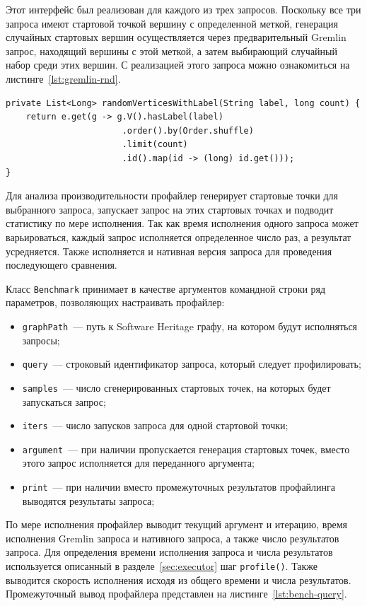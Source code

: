\documentclass[times,specification,annotation]{itmo-student-thesis}
\begin{document}
Этот интерфейс был реализован для каждого из трех запросов. Поскольку все три запроса имеют стартовой точкой вершину с определенной меткой, генерация случайных стартовых вершин осуществляется через предварительный Gremlin запрос, находящий вершины с этой меткой, а затем выбирающий случайный набор среди этих вершин. С реализацией этого запроса можно ознакомиться на листинге~\ref{lst:gremlin-rnd}.

\begin{lstlisting}[float=!h,caption={Генерация случайных стартовых вершин},label={lst:gremlin-rnd}]
private List<Long> randomVerticesWithLabel(String label, long count) {
    return e.get(g -> g.V().hasLabel(label)
                       .order().by(Order.shuffle)
                       .limit(count)
                       .id().map(id -> (long) id.get()));
}
\end{lstlisting}

Для анализа производительности профайлер генерирует стартовые точки для выбранного запроса, запускает запрос на этих стартовых точках и подводит статистику по мере исполнения. Так как время исполнения одного запроса может варьироваться, каждый запрос исполняется определенное число раз, а результат усредняется. Также исполняется и нативная версия запроса для проведения последующего сравнения.

Класс \texttt{Benchmark} принимает в качестве аргументов командной строки ряд параметров, позволяющих настраивать профайлер:

\begin{itemize}
    \item \texttt{graphPath}~--- путь к Software Heritage графу, на котором будут исполняться запросы;
    \item \texttt{query}~--- строковый идентификатор запроса, который следует профилировать;
    \item \texttt{samples}~--- число сгенерированных стартовых точек, на которых будет запускаться запрос;
    \item \texttt{iters}~--- число запусков запроса для одной стартовой точки;
    \item \texttt{argument}~--- при наличии пропускается генерация стартовых точек, вместо этого запрос исполняется для переданного аргумента;
    \item \texttt{print}~--- при наличии вместо промежуточных результатов профайлинга выводятся результаты запроса;
\end{itemize}

По мере исполнения профайлер выводит текущий аргумент и итерацию, время исполнения Gremlin запроса и нативного запроса, а также число результатов запроса. Для определения времени исполнения запроса и числа результатов используется описанный в разделе~\ref{sec:executor} шаг \texttt{profile()}. Также выводится скорость исполнения исходя из общего времени и числа результатов. Промежуточный вывод профайлера представлен на листинге~\ref{lst:bench-query}.
\end{document}
